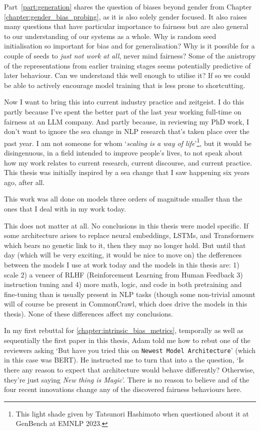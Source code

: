 Part~\ref{part:generation} shares the question of biases beyond gender from Chapter \ref{chapter:gender_bias_probing}, as it is also solely gender focused. It also raises many questions that have particular importance to fairness but are also general to our understanding of our systems as a whole. Why is random seed initialisation so important for bias and for generalisation? Why is it possible for a couple of seeds to \textit{just not work at all}, never mind fairness? Some of the anistropy of the representations from earlier training stages seems potentially predictive of later behaviour. Can we understand this well enough to utilise it? If so we could be able to actively encourage model training that is less prone to shortcutting. 

Now I want to bring this into current industry practice and zeitgeist. I do this partly because I've spent the better part of the last year working full-time on fairness at an LLM company. And partly because, in reviewing my PhD work, I don't want to ignore the sea change in NLP research that's taken place over the past year. I am not someone for whom `\textit{scaling is a way of life}'\footnote{This light shade given by Tatsunori Hashimoto when questioned about it at GenBench at EMNLP 2023.}, but it would be disingenuous, in a field intended to improve people's lives, to not speak about how my work relates to current research, current discourse, and current practice. This thesis was initially inspired by a sea change that I saw happening six years ago, after all. 

This work was all done on models three orders of magnitude smaller than the ones that I deal with in my work today. 

This does not matter at all. No conclusions in this thesis were model specific. If some architecture arises to replace neural embeddings, LSTMs, and Transformers which bears no genetic link to it, then they may no longer hold. But until that day (which will be very exciting, it would be nice to move on) the defferences between the models I use at work today and the models in this thesis are: 1) scale 2) a veneer of RLHF (Reinforcement Learning from Human Feedback \citep{} 3) instruction tuning \citep{} and 4) more math, logic, and code in both pretraining and fine-tuning than is usually present in NLP tasks (though some non-trivial amount will of course be present in CommonCrawl, which does drive the models in this thesis). None of these differences affect my conclusions. 

In my first rebuttal for \ref{chapter:intrinsic_bias_metrics}, temporally as well as sequentially the first paper in this thesis, Adam told me how to rebut one of the reviewers asking `But have you tried this on {\tt Newest Model Architecture}' (which in this case was BERT). He instructed me to turn that into a the question, `Is there any reason to expect that architecture would behave differently? Otherwise, they're just saying \textit{New thing is Magic}'. There is no reason to believe and of the four recent innovations change any of the discovered fairness behaviours here.

